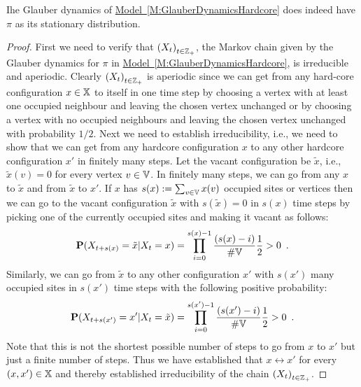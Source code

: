 \begin{prop}
Ihe Glauber dynamics of \hyperref[M:GlauberDynamicsHardcore]{Model~\ref*{M:GlauberDynamicsHardcore}} does indeed have $\pi$ as its stationary distribution.
\begin{proof}
First we need to verify that $\left( X_t \right)_{t \in \mathbb{Z}_+}$, the Markov chain given by the Glauber dynamics for $\pi$ in \hyperref[M:GlauberDynamicsHardcore]{Model~\ref*{M:GlauberDynamicsHardcore}}, is irreducible and aperiodic.  
Clearly $\left( X_t \right)_{t \in \mathbb{Z}_+}$ is aperiodic since we can get from any hard-core configuration $x \in \mathbb{X}$ to itself in one time step by choosing a vertex with at least one occupied neighbour and leaving the chosen vertex unchanged or by choosing a vertex with no occupied neighbours and leaving the chosen vertex unchanged with probability $1/2$.  
Next we need to establish irreducibility, i.e., we need to show that we can get from any hardcore configuration $x$ to any other hardcore configuration $x'$ in finitely many steps.  
Let the vacant configuration be $\tilde{x}$, i.e., $\tilde{x}(v)=0$ for every vertex $v \in \mathbb{V}$.  
In finitely many steps, we can go from any $x$ to $\tilde{x}$ and from $\tilde{x}$ to $x'$.  
If $x$ has $s(x):=\sum_{v \in \mathbb{V}}x(v)$ occupied sites or vertices then we can go to the vacant configuration $\tilde{x}$ with $s(\tilde{x})=0$ in $s(x)$ time steps by picking one of the currently occupied sites and making it vacant as follows:
\[
\mathbf{P}(X_{t+s(x)} = \tilde{x} | X_t = x) = \prod_{i=0}^{s(x)-1} \frac{(s(x)-i)}{\#\mathbb{V}}\frac{1}{2} > 0 \enspace .
\]
Similarly, we can go from $\tilde{x}$ to any other configuration $x'$ with $s(x')$ many occupied sites in $s(x')$ time steps with the following positive probability:
\[
\mathbf{P}(X_{t+s(x')} = x' | X_t = \tilde{x}) = \prod_{i=0}^{s(x')-1} \frac{(s(x')-i)}{\#\mathbb{V}}\frac{1}{2} > 0 \enspace .
\]
Note that this is not the shortest possible number of steps to go from $x$ to $x'$ but just a finite number of steps.  
Thus we have established that $x \leftrightarrow x'$ for every $(x,x') \in \mathbb{X}$ and thereby established irreducibility of the chain $\left( X_t \right)_{t \in \mathbb{Z}_+}$.  


\end{proof}
\end{prop}
